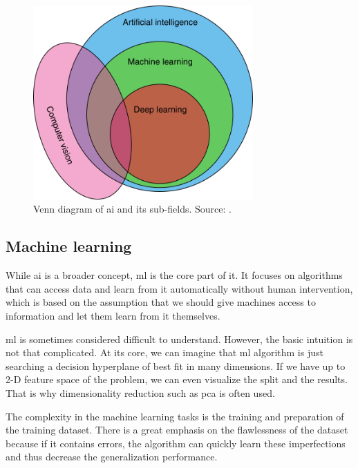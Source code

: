         \begin{figure}[ht]
            \centering
            \includegraphics[width=0.75\textwidth]{resources/artificial_intelligence_set.png}
            \caption{Venn diagram of \gls{ai} and its sub-fields. Source: \cite{ruffle2018artificial}.}
            \label{fig:image_classification}
        \end{figure}
    
    \subsection{Machine learning}
        While \gls{ai} is a broader concept, \gls{ml} is the core part of it. It focuses on algorithms that can access data and learn from it automatically without human intervention, which is based on the assumption that we should give machines access to information and let them learn from it themselves.
        
        \Gls{ml} is sometimes considered difficult to understand. However, the basic intuition is not that complicated. At its core, we can imagine that \gls{ml} algorithm is just searching a decision hyperplane of best fit in many dimensions. If we have up to 2-D feature space of the problem, we can even visualize the split and the results. That is why dimensionality reduction such as \gls{pca} \cite{pearson1901liii} is often used.
        
        The complexity in the machine learning tasks is the training and preparation of the training dataset. There is a great emphasis on the flawlessness of the dataset because if it contains errors, the algorithm can quickly learn these imperfections and thus decrease the generalization performance. 
        
